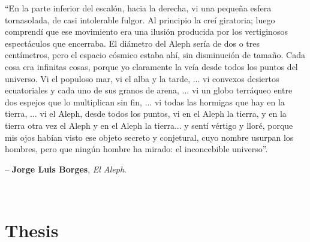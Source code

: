 \documentclass[11pt,english,a4paper,hidelinks]{book}
\begin{document}
\begin{flushright}
\begin{minipage}{0.7\textwidth} 
    ``En la parte inferior del escalón, hacia la derecha, vi una pequeña 
    esfera tornasolada, de casi intolerable fulgor. Al principio la creí 
    giratoria; luego comprendí que ese movimiento era una ilusión producida 
    por los vertiginosos espectáculos que encerraba. El diámetro del Aleph 
    sería de dos o tres centímetros, pero el espacio cósmico estaba ahí, 
    sin disminución de tamaño. Cada cosa 
    era infinitas cosas, porque yo claramente la veía desde todos los puntos 
    del universo. Vi el populoso mar, vi el alba y la tarde, ... vi 
    convexos desiertos ecuatoriales y cada uno de sus granos de arena, ... 
    vi un globo terráqueo entre dos espejos que lo multiplican sin fin, ... 
    vi todas las hormigas que hay en la tierra, ... vi el Aleph, desde 
    todos los puntos, vi en el Aleph la tierra, y en la tierra otra vez el 
    Aleph y en el Aleph la tierra... y sentí vértigo y lloré, 
    porque mis ojos habían visto ese objeto secreto y conjetural, cuyo 
    nombre usurpan los hombres, pero que ningún hombre ha mirado: el 
    inconcebible universo''.
    
    \medskip
    \raggedleft \normalfont -- \textbf{Jorge Luis Borges}, \textit{El Aleph}.
\end{minipage}
\end{flushright}

\vfill
\vfill 
\newpage


\newpage
\thispagestyle{empty}\ \\
\tableofcontents\newpage\thispagestyle{empty}

\listoffigures\thispagestyle{empty}\newpage\thispagestyle{empty}

\listoftables\thispagestyle{empty}\newpage\thispagestyle{empty}


\newpage

\thispagestyle{empty}
\setcounter{page}{-2}

\part{Thesis}
\end{document}
